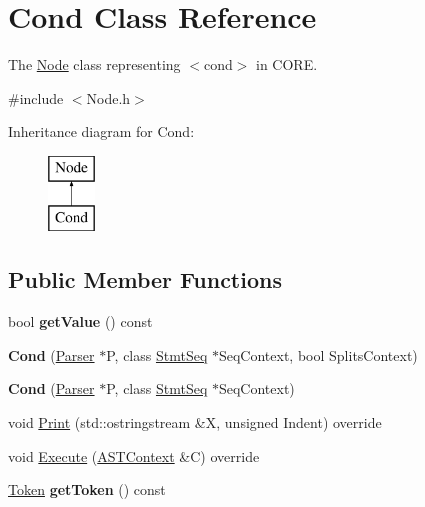 \hypertarget{class_cond}{}\section{Cond Class Reference}
\label{class_cond}


The \mbox{\hyperlink{class_node}{Node}} class representing {\ttfamily $<$cond$>$} in C\+O\+RE.  




{\ttfamily \#include $<$Node.\+h$>$}

Inheritance diagram for Cond\+:\begin{figure}[H]
\begin{center}
\leavevmode
\includegraphics[height=2.000000cm]{class_cond}
\end{center}
\end{figure}
\subsection*{Public Member Functions}
\begin{DoxyCompactItemize}
\item 
\mbox{\label{class_cond_a3c48bff12aaaad279c268cd514180355}} 
bool {\bfseries get\+Value} () const
\item 
\mbox{\label{class_cond_a7ebf8053d93fce1edaa358b32fdb911d}} 
{\bfseries Cond} (\mbox{\hyperlink{class_parser}{Parser}} $\ast$P, class \mbox{\hyperlink{class_stmt_seq}{Stmt\+Seq}} $\ast$Seq\+Context, bool Splits\+Context)
\item 
\mbox{\label{class_cond_ac12b1a5eabc6a623c2aaff2ab5c9d4a1}} 
{\bfseries Cond} (\mbox{\hyperlink{class_parser}{Parser}} $\ast$P, class \mbox{\hyperlink{class_stmt_seq}{Stmt\+Seq}} $\ast$Seq\+Context)
\item 
void \mbox{\hyperlink{class_cond_acb604011c472b21934e134c07f3cf0c1}{Print}} (std\+::ostringstream \&X, unsigned Indent) override
\item 
void \mbox{\hyperlink{class_cond_ae5e176f4872c49912bc792367f4dff80}{Execute}} (\mbox{\hyperlink{class_a_s_t_context}{A\+S\+T\+Context}} \&C) override
\item 
\mbox{\label{class_cond_af89ce5aaf2563da1b98fc5fbfca81e30}} 
\mbox{\hyperlink{class_token}{Token}} {\bfseries get\+Token} () const
\end{DoxyCompactItemize}
